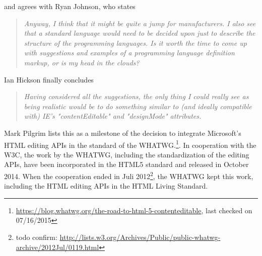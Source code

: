 and agrees with Ryan Johnson, who states

\begin{quotation}
\textit{Anyway, I think that it might be quite a jump for manufacturers. I also see that a standard language would need to be decided upon just to describe the structure of the programming languages. Is it worth the time to come up with suggestions and examples of a programming language definition markup, or is my head in the clouds?}
\end{quotation}

Ian Hickson finally concludes

\begin{quotation}
\textit{Having considered all the suggestions, the only thing I could really see 
as being realistic would be to do something similar to (and ideally 
compatible with) IE's "contentEditable" and "designMode" attributes.}
\end{quotation}

Mark Pilgrim lists this as a milestone of the decision to integrate Microsoft's HTML editing APIs in the standard of the WHATWG.\footnote{\url{https://blog.whatwg.org/the-road-to-html-5-contenteditable}, last checked on 07/16/2015}. In cooperation with the W3C, the work by the WHATWG, including the standardization of the editing APIs, have been incorporated in the HTML5 standard and released in October 2014. When the cooperation ended in Juli 2012\footnote{todo confirm: \url{http://lists.w3.org/Archives/Public/public-whatwg-archive/2012Jul/0119.html}}, the WHATWG kept this work, including the HTML editing APIs in the HTML Living Standard.




